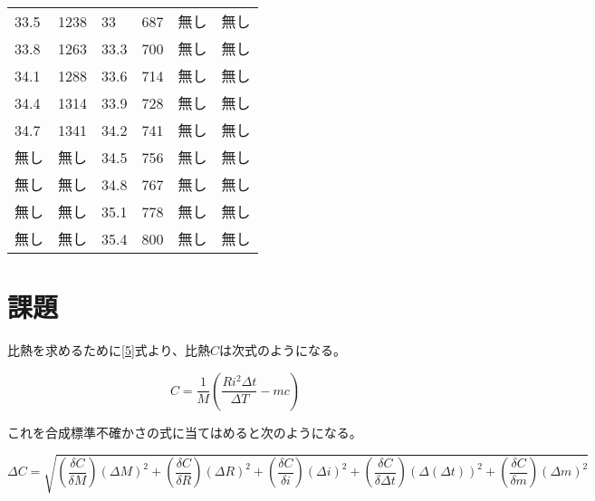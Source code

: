 \documentclass{jsarticle}
\begin{document}
\begin{longtable}[h]
\begin{longtable}{llllll}
33.5                     & 1238                    & 33                      & 687                     & 無し                      & 無し                      \\
33.8                     & 1263                    & 33.3                    & 700                     & 無し                      & 無し                      \\
34.1                     & 1288                    & 33.6                    & 714                     & 無し                      & 無し                      \\
34.4                     & 1314                    & 33.9                    & 728                     & 無し                      & 無し                      \\
34.7                     & 1341                    & 34.2                    & 741                     & 無し                      & 無し                      \\
無し                       & 無し                      & 34.5                    & 756                     & 無し                      & 無し                      \\
無し                       & 無し                      & 34.8                    & 767                     & 無し                      & 無し                      \\
無し                       & 無し                      & 35.1                    & 778                     & 無し                      & 無し                      \\
無し                       & 無し                      & 35.4                    & 800                     & 無し                      & 無し                     
\end{longtable}
\end{longtable}
\fi


\section{課題}

比熱を求めるために\ref{5}式より、比熱$C$は次式のようになる。

\begin{equation}
	C = \frac{1}{M}(\frac{Ri^2\Delta t}{\Delta T}-mc)
\end{equation}

これを合成標準不確かさの式に当てはめると次のようになる。

\begin{equation}
	\Delta C = \sqrt{(\frac{\delta C}{\delta M})(\Delta M)^2 + (\frac{\delta C}{\delta R})(\Delta R)^2 + (\frac{\delta C}{\delta i})(\Delta i)^2 + (\frac{\delta C}{\delta \Delta t})(\Delta(\Delta t))^2 + (\frac{\delta C}{\delta m})(\Delta m)^2}
\end{equation}
\end{document}
